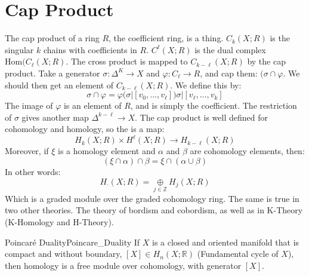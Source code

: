 \documentclass{book}                                                           %
\begin{document}
        \section{Cap Product}
            The cap product of a ring $R$, the coefficient ring,
            is a thing. $C_{k}(X;R)$ is the singular $k$ chains with
            coefficients in $R$. $C^{\ell}(X;R)$ is the dual complex
            $\mathrm{Hom}(C_{\ell}(X;R)$. The cross product is mapped
            to $C_{k-\ell}(X;R)$ by the cap product. Take a generator
            $\sigma:\Delta^{K}\rightarrow{X}$ and
            $\varphi:C_{\ell}\rightarrow{R}$, and cap them:
            $(\sigma\cap\varphi$. We should then get an element of
            $C_{k-\ell}(X;R)$. We define this by:
            \begin{equation}
                \sigma\cap\varphi
                =\varphi(\sigma|[v_{0},\dots,v_{\ell}])
                    \sigma|[v_{\ell},\dots,v_{k}]
            \end{equation}
            The image of $\varphi$ is an element of $R$, and is simply
            the coefficient. The restriction of $\sigma$ gives another
            map $\Delta^{k-\ell}\rightarrow{X}$. The cap product is well
            defined for cohomology and homology, so the is a map:
            \begin{equation}
                H_{k}(X;R)\times{H}^{\ell}(X;R)\rightarrow
                    H_{k-\ell}(X;R)
            \end{equation}
            Moreover, if $\xi$ is a homology element and $\alpha$ and
            $\beta$ are cohomology elements, then:
            \begin{equation}
                (\xi\cap\alpha)\cap\beta=\xi\cap(\alpha\cup\beta)
            \end{equation}
            In other words:
            \begin{equation}
                H_{\cdot}(X;R)=\underset{j\in\mathbb{Z}}{\oplus}
                    H_{j}(X;R)
            \end{equation}
            Which is a graded module over the graded cohomology ring.
            The same is true in two other theories. The theory of
            bordism and cobordism, as well as in K-Theory
            (K-Homology and H-Theory).
            \begin{ltheorem}{Poincar\'{e} Duality}{Poincare_Duality}
                If $X$ is a closed and oriented manifold that is
                compact and without boundary,
                $[X]\in{H}_{n}(X;\mathbb{R})$ (Fundamental cycle of $X$),
                then homology is a free module over cohomology, with
                generator $[X]$.
            \end{ltheorem}
\end{document}
